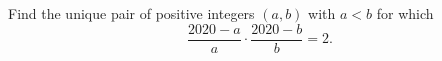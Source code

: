 Find the unique pair of positive integers $(a,b)$ with $a< b$ for which\[\frac{2020-a}{a}\cdot \frac{2020-b}{b}=2.\]